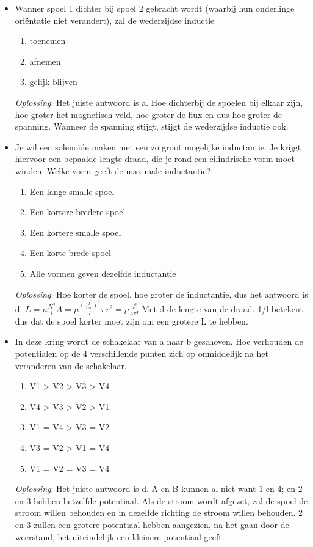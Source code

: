\documentclass[12pt,a4paper]{article}
\begin{document}
\begin{itemize}
    	\item Wanner spoel 1 dichter bij spoel 2 gebracht wordt (waarbij hun onderlinge oriëntatie niet verandert), zal de wederzijdse inductie
    	\begin{enumerate}[label=\alph*]
    		\item toenemen
    		\item afnemen
    		\item gelijk blijven
    	\end{enumerate}
    	\textit{Oplossing}: Het juiste antwoord is a. Hoe dichterbij de spoelen bij elkaar zijn, hoe groter het magnetisch veld, hoe groter de flux en dus hoe groter de spanning. Wanneer de spanning stijgt, stijgt de wederzijdse inductie ook. 
    	\item Je wil een solenoïde maken met een zo groot mogelijke inductantie. Je krijgt hiervoor een bepaalde lengte draad, die je rond een cilindrische vorm moet winden. Welke vorm geeft de maximale inductantie?
    	\begin{enumerate}[label=\alph*]
    		\item Een lange smalle spoel
    		\item Een kortere bredere spoel
    		\item Een kortere smalle spoel
    		\item Een korte brede spoel
    		\item Alle vormen geven dezelfde inductantie 
    	\end{enumerate}
    	\textit{Oplossing}: Hoe korter de spoel, hoe groter de inductantie, dus het antwoord is d. \(L = \mu\frac{N^2}{l}A = \mu\frac{(\frac{d}{2\pi r})^2}{l}\pi r^2 = \mu\frac{d^2}{4\pi l}\)
    	Met d de lengte van de draad. 1/l betekent dus dat de spoel korter moet zijn om een grotere L te hebben. 
    	\item In deze kring wordt de schakelaar van a naar b geschoven. Hoe verhouden de potentialen op de 4 verschillende punten zich op onmiddelijk na het veranderen van de schakelaar. 
    	\begin{enumerate}[label=\alph*]
    		\item V1 > V2 > V3 > V4
    		\item V4 > V3 > V2 > V1
    		\item V1 = V4 > V3 = V2
    		\item V3 = V2 > V1 = V4
    		\item V1 = V2 = V3 = V4
    	\end{enumerate}
    	\textit{Oplossing}: Het juiste antwoord is d. A en B kunnen al niet want 1 en 4; en 2 en 3 hebben hetzelfde potentiaal. Als de stroom wordt afgezet, zal de spoel de stroom willen behouden en in dezelfde richting de stroom willen behouden. 2 en 3 zullen een grotere potentiaal hebben aangezien, na het gaan door de weerstand, het uiteindelijk een kleinere potentiaal geeft. 

\end{itemize}
\end{document}
